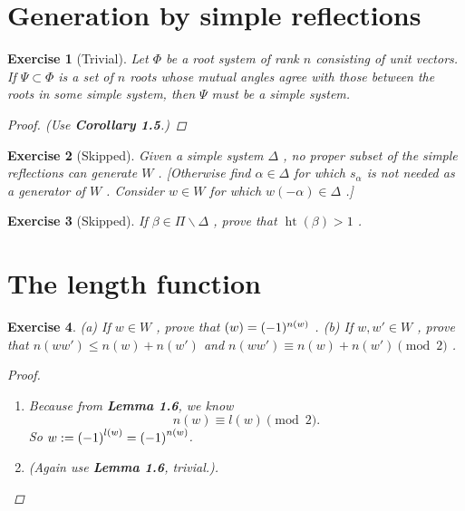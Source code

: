 \documentclass{article}
\theoremstyle{breakstyle}
\newtheorem{exercise}{Exercise}[section]
\let\det\relax
\DeclareMathOperator{\det}{Det}
\begin{document}
\setcounter{section}{4}
\section{Generation by simple reflections}

\begin{exercise}[Trivial]
Let $\Phi$ be a root system of rank $n$ consisting of unit vectors. If $\Psi
\subset \Phi$ is a set of $n$ roots whose mutual angles agree with those between
the roots in some simple system, then $\Psi$ must be a simple system.

\begin{proof}
    \emph{(Use \textbf{Corollary 1.5}.)}
\end{proof}

\end{exercise}

\begin{exercise}[Skipped]
Given a simple system $\Delta$ , no proper subset of the simple reflections can
generate $W$ . [Otherwise find $\alpha \in \Delta$ for which $s_{\alpha}$ is not
needed as a generator of $W$ . Consider $w \in W$ for which $w(-\alpha) \in
\Delta$ .]
\end{exercise}

\begin{exercise}[Skipped]
    If $\beta \in \Pi \backslash \Delta$ , prove that $\operatorname{ht}(\beta)
    > 1$ .
\end{exercise}

\section{The length function}

\begin{exercise}
(a) If $w \in W$ , prove that $\det(w) = (-1)^{n(w)}$ . (b) If $w, w' \in W$ ,
prove that $n(ww') \leq n(w) + n(w')$ and $n(ww') \equiv n(w) + n(w') \pmod{2}$
.

\begin{proof}
    \begin{enumerate}[label=({\alph*})]
        \item 
            Because from \textbf{Lemma 1.6}, we know
            $$
            n(w)\equiv l(w)\pmod{2}
            .$$
            So $\det{w}:=\left( -1 \right) ^{l\left( w \right) }=\left( -1
            \right) ^{n\left( w \right) }$.
        \item 
            \emph{(Again use \textbf{Lemma 1.6}, trivial.)}.
    \end{enumerate}
\end{proof}

\end{exercise}
\end{document}

